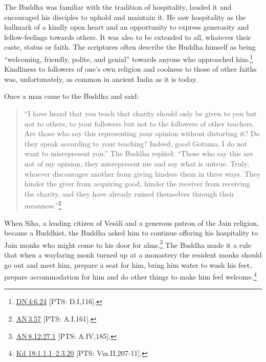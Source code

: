 \documentclass[10pt, openright]{book}
\begin{document}
The Buddha was familiar with the tradition of hospitality, lauded it and encouraged his disciples to uphold and maintain it. He saw hospitality as the hallmark of a kindly open heart and an opportunity to express generosity and fellow-feelings towards others. It was also to be extended to all, whatever their caste, status or faith. The scriptures often describe the Buddha himself as being “welcoming, friendly, polite, and genial” towards anyone who approached him.\footnote {\href{https://suttacentral.net/dn4/en/sujato\#6.24}{DN 4:6.24} [PTS: D.I,116].} Kindliness to followers of one’s own religion and coolness to those of other faiths was, unfortunately, as common in ancient India as it is today.


Once a man came to the Buddha and said:


\begin{quote}


“I have heard that you teach that charity should only be given to you but not to others, to your followers but not to the followers of other teachers. Are those who say this representing your opinion without distorting it? Do they speak according to your teaching? Indeed, good Gotama, I do not want to misrepresent you.” The Buddha replied: “Those who say this are not of my opinion, they misrepresent me and say what is untrue. Truly, whoever discourages another from giving hinders them in three ways. They hinder the giver from acquiring good, hinder the receiver from receiving the charity, and they have already ruined themselves through their meanness.”\footnote {\href{https://suttacentral.net/an3.57/en/sujato}{AN 3.57} [PTS: A.I,161].}




\end{quote}
When Sīha, a leading citizen of Vesālī and a generous patron of the Jain religion, became a Buddhist, the Buddha asked him to continue offering his hospitality to Jain monks who might come to his door for alms.\footnote {\href{https://suttacentral.net/an8.12/en/sujato\#27.1}{AN 8.12:27.1} [PTS: A.IV,185].} The Buddha made it a rule that when a wayfaring monk turned up at a monastery the resident monks should go out and meet him, prepare a seat for him, bring him water to wash his feet, prepare accommodation for him and do other things to make him feel welcome.\footnote {\href{https://suttacentral.net/pli-tv-kd18/en/brahmali#1.1.1}{Kd 18:1.1.1–2.3.20} [PTS: Vin.II,207-11].}
\end{document}
